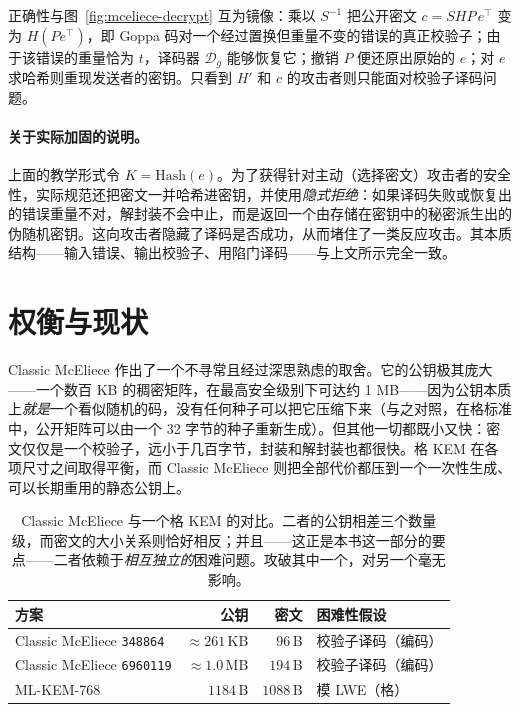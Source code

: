 正确性与图~\ref{fig:mceliece-decrypt} 互为镜像：乘以 $S^{-1}$ 把公开密文 $c = SHP\,e^\top$ 变为 $H(Pe^\top)$，即 Goppa 码对一个经过置换但重量不变的错误的真正校验子；由于该错误的重量恰为 $t$，译码器 $\mathcal{D}_g$ 能够恢复它；撤销 $P$ 便还原出原始的 $e$；对 $e$ 求哈希则重现发送者的密钥。只看到 $H'$ 和 $c$ 的攻击者则只能面对校验子译码问题。

\paragraph{关于实际加固的说明。}
上面的教学形式令 $K = \mathrm{Hash}(e)$。为了获得针对主动（选择密文）攻击者的安全性，实际规范还把密文一并哈希进密钥，并使用\emph{隐式拒绝}：如果译码失败或恢复出的错误重量不对，解封装不会中止，而是返回一个由存储在密钥中的秘密派生出的伪随机密钥。这向攻击者隐藏了译码是否成功，从而堵住了一类反应攻击。其本质结构——输入错误、输出校验子、用陷门译码——与上文所示完全一致。

\section{权衡与现状}

Classic McEliece 作出了一个不寻常且经过深思熟虑的取舍。它的公钥极其庞大——一个数百 KB 的稠密矩阵，在最高安全级别下可达约 1 MB——因为公钥本质上\emph{就是}一个看似随机的码，没有任何种子可以把它压缩下来（与之对照，在格标准中，公开矩阵可以由一个 32 字节的种子重新生成）。但其他一切都既小又快：密文仅仅是一个校验子，远小于几百字节，封装和解封装也都很快。格 KEM 在各项尺寸之间取得平衡，而 Classic McEliece 则把全部代价都压到一个一次性生成、可以长期重用的静态公钥上。

\begin{table}[H]
\centering
\begin{tabular}{lrrl}
\toprule
方案 & 公钥 & 密文 & 困难性假设 \\
\midrule
Classic McEliece \texttt{348864}  & $\approx 261$\,KB & $96$\,B  & 校验子译码（编码） \\
Classic McEliece \texttt{6960119} & $\approx 1.0$\,MB & $194$\,B & 校验子译码（编码） \\
ML-KEM-768                        & $1184$\,B          & $1088$\,B & 模 LWE（格） \\
\bottomrule
\end{tabular}
\caption{Classic McEliece 与一个格 KEM 的对比。二者的公钥相差三个数量级，而密文的大小关系则恰好相反；并且——这正是本书这一部分的要点——二者依赖于\emph{相互独立的}困难问题。攻破其中一个，对另一个毫无影响。}
\label{tab:mce-vs-mlkem}
\end{table}

